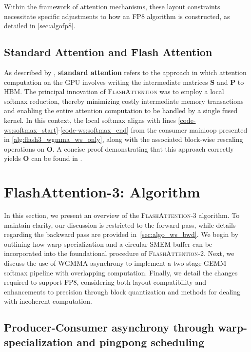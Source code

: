 \begin{enumerate}
Within the framework of attention mechanisms, these layout constraints necessitate specific adjustments to how an FP8 algorithm is constructed, as detailed in \cref{sec:algofp8}.

\subsection{Standard Attention and Flash Attention} As described by \citet{dao2022flashattention}, \textbf{standard attention} refers to the approach in which attention computation on the GPU involves writing the intermediate matrices $\mathbf{S}$ and $\mathbf{P}$ to HBM. The principal innovation of \textsc{FlashAttention} was to employ a local softmax reduction, thereby minimizing costly intermediate memory transactions and enabling the entire attention computation to be handled by a single fused kernel. In this context, the local softmax aligns with lines \ref{code-ws:softmax_start}-\ref{code-ws:softmax_end} from the consumer mainloop presented in \cref{alg:flash3_wgmma_ws_only}, along with the associated block-wise rescaling operations on $\mathbf{O}$. A concise proof demonstrating that this approach correctly yields $\mathbf{O}$ can be found in \cite[\S 2.3.1]{dao2023flashattention2}.

\section{FlashAttention-3: Algorithm}
\label{sec:algo}

In this section, we present an overview of the \textsc{FlashAttention-3} algorithm. To maintain clarity, our discussion is restricted to the forward pass, while details regarding the backward pass are provided in~\cref{sec:algo_ws_bwd}. We begin by outlining how warp-specialization and a circular SMEM buffer can be incorporated into the foundational procedure of \textsc{FlashAttention-2}. Next, we discuss the use of WGMMA asynchrony to implement a two-stage GEMM-softmax pipeline with overlapping computation. Finally, we detail the changes required to support FP8, considering both layout compatibility and enhancements to precision through block quantization and methods for dealing with incoherent computation.

\subsection{Producer-Consumer asynchrony through warp-specialization and pingpong scheduling}
\label{sec:algo_ws}


\end{enumerate}
